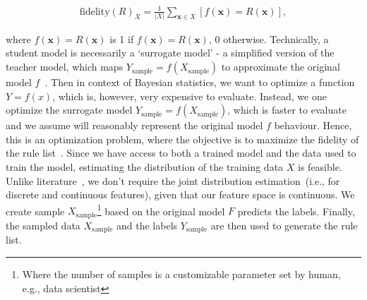 \vspace{-6mm}
\begin{align}
    \text {fidelity}(R)_{{X}}=\frac{1}{|{X}|} \sum_{\boldsymbol{x} \in {X}}[f(\boldsymbol{x})=R(\boldsymbol{x})],
    \label{eq:fidelity}
\end{align}

\hspace*{3.5mm} where $f(\boldsymbol{x})=R(\boldsymbol{x})$ is 1 if $f(\boldsymbol{x})=R(\boldsymbol{x})$, 0 otherwise. Technically, a student model is necessarily a `surrogate model' - a simplified version of the teacher model, which maps $Y_\text{sample}=f(X_\text{sample})$ to approximate the original model $f$~\cite{forrester2008engineering}. Then in context of Bayesian statistics, we want to optimize a function $Y=f(x)$, which is, however, very expensive to evaluate. Instead, we one optimize the surrogate model $Y_\text{sample}=f(X_\text{sample})$, which is faster to evaluate and we assume will reasonably represent the original model $f$ behaviour. Hence, this is an optimization problem, where the objective is to maximize the fidelity of the rule list~\cite{ming2018rulematrix}. Since we have access to both a trained model and the data used to train the model, estimating the distribution of the training data ${X}$ is feasible. Unlike literature~\cite{ming2018rulematrix}, we don't require the joint distribution estimation~(i.e., for discrete and continuous features), given that our feature space is continuous. We create sample ${X}_{\text {sample}}$\footnote{Where the number of samples is a customizable parameter set by human, e.g., data scientist} based on the original model $F$ predicts the labels. Finally, the sampled data ${X}_{\text {sample}}$ and the labels ${Y}_{\text {sample}}$ are then used to generate the rule list.

